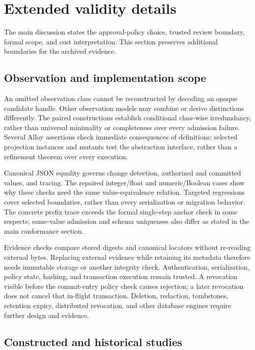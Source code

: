 \section{Extended validity details}
\label{app:extended-validity}

The main discussion states the approval-policy choice, trusted review boundary, formal scope, and cost interpretation. This section preserves additional boundaries for the archived evidence.

\subsection{Observation and implementation scope}

An omitted observation class cannot be reconstructed by decoding an opaque candidate handle. Other observation models may combine or derive distinctions differently. The paired constructions establish conditional class-wise irredundancy, rather than universal minimality or completeness over every admission failure. Several Alloy assertions check immediate consequences of definitions; selected projection instances and mutants test the abstraction interface, rather than a refinement theorem over every execution.

Canonical JSON equality governs change detection, authorized and committed values, and tracing. The repaired integer/float and numeric/Boolean cases show why these checks need the same value-equivalence relation. Targeted regressions cover selected boundaries, rather than every serialization or migration behavior. The concrete prefix trace exceeds the formal single-step anchor check in some respects; same-value admission and schema uniqueness also differ as stated in the main conformance section.

Evidence checks compare stored digests and canonical locators without re-reading external bytes. Replacing external evidence while retaining its metadata therefore needs immutable storage or another integrity check. Authentication, serialization, policy state, hashing, and transaction execution remain trusted. A revocation visible before the commit-entry policy check causes rejection; a later revocation does not cancel that in-flight transaction. Deletion, redaction, tombstones, retention expiry, distributed revocation, and other database engines require further design and evidence.

\subsection{Constructed and historical studies}

